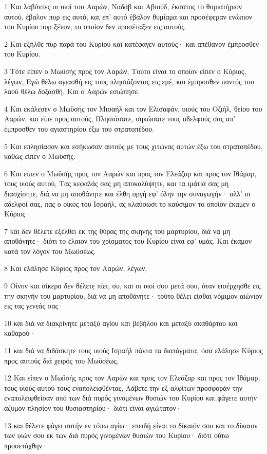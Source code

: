 \par 1 Και λαβόντες οι υιοί του Ααρών, Ναδάβ και Αβιούδ, έκαστος το θυμιατήριον αυτού, έβαλον πυρ εις αυτό, και επ' αυτό έβαλον θυμίαμα και προσέφεραν ενώπιον του Κυρίου πυρ ξένον, το οποίον δεν προσέταξεν εις αυτούς.
\par 2 Και εξήλθε πυρ παρά του Κυρίου και κατέφαγεν αυτούς· και απέθανον έμπροσθεν του Κυρίου.
\par 3 Τότε είπεν ο Μωϋσής προς τον Ααρών, Τούτο είναι το οποίον είπεν ο Κύριος, λέγων, Εγώ θέλω αγιασθή εις τους πλησιάζοντας εις εμέ, και έμπροσθεν παντός του λαού θέλω δοξασθή. Και ο Ααρών εσιώπησε.
\par 4 Και εκάλεσεν ο Μωϋσής τον Μισαήλ και τον Ελισαφάν, υιούς του Οζιήλ, θείου του Ααρών, και είπε προς αυτούς, Πλησιάσατε, σηκώσατε τους αδελφούς σας απ' έμπροσθεν του αγιαστηρίου έξω του στρατοπέδου.
\par 5 Και επλησίασαν και εσήκωσαν αυτούς με τους χιτώνας αυτών έξω του στρατοπέδου, καθώς είπεν ο Μωϋσής.
\par 6 Και είπεν ο Μωϋσής προς τον Ααρών και προς τον Ελεάζαρ και προς τον Ιθάμαρ, τους υιούς αυτού, Τας κεφαλάς σας μη αποκαλύψητε, και τα ιμάτιά σας μη διασχίσητε, διά να μη αποθάνητε και έλθη οργή εφ' όλην την συναγωγήν· αλλ' οι αδελφοί σας, πας ο οίκος του Ισραήλ, ας κλαύσωσι το καύσιμον το οποίον έκαμεν ο Κύριος·
\par 7 και δεν θέλετε εξέλθει εκ της θύρας της σκηνής του μαρτυρίου, διά να μη αποθάνητε· διότι το έλαιον του χρίσματος του Κυρίου είναι εφ' υμάς. Και έκαμον κατά τον λόγον του Μωϋσέως.
\par 8 Και ελάλησε Κύριος προς τον Ααρών, λέγων,
\par 9 Οίνον και σίκερα δεν θέλετε πίει, συ, και οι υιοί σου μετά σου, όταν εισέρχησθε εις την σκηνήν του μαρτυρίου, διά να μη αποθάνητε· τούτο θέλει είσθαι νόμιμον αιώνιον εις τας γενεάς σας·
\par 10 και διά να διακρίνητε μεταξύ αγίου και βεβήλου και μεταξύ ακαθάρτου και καθαρού·
\par 11 και διά να διδάσκητε τους υιούς Ισραήλ πάντα τα διατάγματα, όσα ελάλησε Κύριος προς αυτούς διά χειρός του Μωϋσέως.
\par 12 Και είπεν ο Μωϋσής προς τον Ααρών και προς τον Ελεάζαρ και προς τον Ιθάμαρ, τους υιούς αυτού τους εναπολειφθέντας, Λάβετε την εξ αλφίτων προσφοράν την εναπολειφθείσαν από των διά πυρός γινομένων θυσιών του Κυρίου και φάγετε αυτήν άζυμον πλησίον του θυσιαστηρίου· διότι είναι αγιώτατον·
\par 13 και θέλετε φάγει αυτήν εν τόπω αγίω· επειδή είναι το δίκαιόν σου και το δίκαιον των υιών σου εκ των διά πυρός γινομένων θυσιών του Κυρίου· διότι ούτω προσετάχθην·
